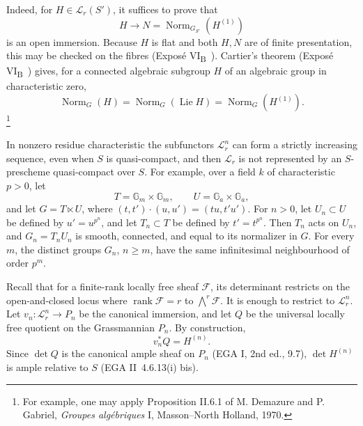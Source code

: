 
Indeed, for \(H\in\mathcal L_r(S')\), it suffices to prove that
\[
  H\longrightarrow N=\operatorname{Norm}_{G_{S'}}(H^{(1)})
\]
is an open immersion. Because \(H\) is flat and both \(H,N\) are of
finite presentation, this may be checked on the fibres (Exposé
VI\textsubscript{B}~). Cartier's theorem (Exposé
VI\textsubscript{B}~) gives, for a connected algebraic subgroup
\(H\) of an algebraic group in characteristic zero,
\[
 \operatorname{Norm}_G(H)
 =\operatorname{Norm}_G(\operatorname{Lie}H)
 =\operatorname{Norm}_G(H^{(1)}).
\]
\footnote{For example, one may apply Proposition II.6.1 of
M. Demazure and P. Gabriel, \emph{Groupes algébriques} I,
Masson--North Holland, 1970.}

In nonzero residue characteristic the subfunctors
\(\mathcal L_r^n\) can form a strictly increasing sequence, even when
\(S\) is quasi-compact, and then \(\mathcal L_r\) is not represented
by an \(S\)-prescheme quasi-compact over \(S\). For example, over a
field \(k\) of characteristic \(p>0\), let
\[
 T=\mathbb G_m\times\mathbb G_m,\qquad
 U=\mathbb G_a\times\mathbb G_a,
\]
and let \(G=T\ltimes U\), where
\((t,t')\cdot(u,u')=(tu,t'u')\). For \(n>0\), let \(U_n\subset U\)
be defined by \(u'=u^{p^n}\), and let \(T_n\subset T\) be defined by
\(t'=t^{p^n}\). Then \(T_n\) acts on \(U_n\), and
\(G_n=T_nU_n\) is smooth, connected, and equal to its normalizer in
\(G\). For every \(m\), the distinct groups \(G_n\), \(n\geq m\),
have the same infinitesimal neighbourhood of order \(p^m\).


Recall that for a finite-rank locally free sheaf \(\mathcal F\), its
determinant restricts on the open-and-closed locus where
\(\operatorname{rank}\mathcal F=r\) to \(\bigwedge^r\mathcal F\).
It is enough to restrict to \(\mathcal L_r^n\). Let
\(v_n:\mathcal L_r^n\to P_n\) be the canonical immersion, and let
\(Q\) be the universal locally free quotient on the Grassmannian
\(P_n\). By construction,
\[
  v_n^*Q=H^{(n)}.
\]
Since \(\det Q\) is the canonical ample sheaf on \(P_n\) (EGA I,
2nd ed., 9.7), \(\det H^{(n)}\) is ample relative to \(S\)
(EGA II~4.6.13(i) bis).

